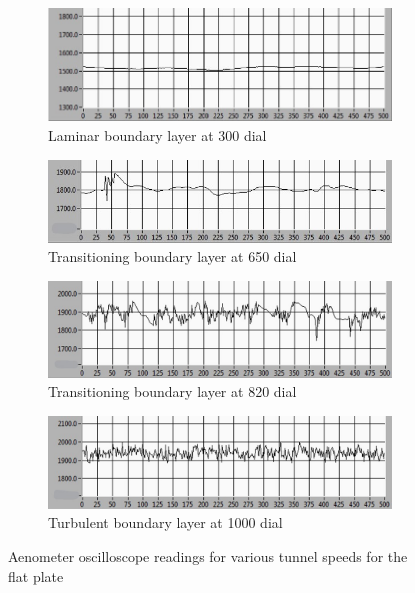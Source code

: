 \documentclass{article}
\begin{document}
\begin{figure}[H]
    \centering 
    \begin{subfigure}{0.8\textwidth}
        \includegraphics[width=\textwidth]{1_laminar.jpg}
        \caption{Laminar boundary layer at 300 dial}
    \end{subfigure}
    \begin{subfigure}{0.8\textwidth}
        \includegraphics[width=\textwidth]{2_transition.jpg}
        \caption{Transitioning boundary layer at 650 dial}
    \end{subfigure}
    \begin{subfigure}{0.8\textwidth}
        \includegraphics[width=\textwidth]{3_transition.jpg}
        \caption{Transitioning boundary layer at 820 dial}
    \end{subfigure}
    \begin{subfigure}{0.8\textwidth}
        \includegraphics[width=\textwidth]{4_turbulent.jpg}
        \caption{Turbulent boundary layer at 1000 dial}
    \end{subfigure}
    \caption{Aenometer oscilloscope readings for various tunnel speeds for the flat plate}
    \label{fig:boundary_layer}
\end{figure}
\end{document}
